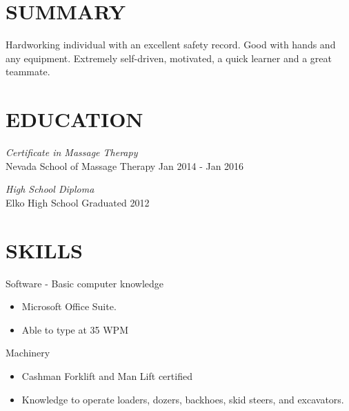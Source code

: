 \documentclass[margin, 10pt]{res} %
\begin{document}
\begin{resume}

 
\section{SUMMARY}  
Hardworking individual with an excellent safety record. Good with hands and any equipment. Extremely self-driven, motivated, a quick learner and a great teammate.


\section{EDUCATION}

{\sl Certificate in Massage Therapy} \\ Nevada School of Massage Therapy \hfill Jan 2014 - Jan 2016

{\sl High School Diploma} \\ Elko High School \hfill Graduated 2012


\section{SKILLS}

Software - Basic computer knowledge
\begin{itemize} \itemsep -2pt
\item Microsoft Office Suite.
\item Able to type at 35 WPM
\end{itemize} 

Machinery 
\begin{itemize} \itemsep -2pt
\item Cashman Forklift and Man Lift certified
\item Knowledge to operate loaders, dozers, backhoes, skid steers, and excavators.  
\end{itemize} 
 

\end{resume}
\end{document}
